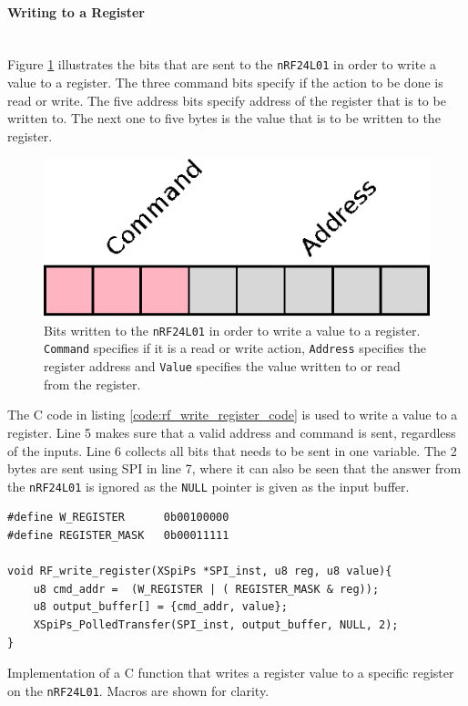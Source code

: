 \paragraph{Writing to a Register} %
\label{par:writing_to_a_register}
~\\
Figure \ref{fig:rw_register} illustrates the bits that are sent to the \texttt{nRF24L01} in order to write a value to a register. 
The three command bits specify if the action to be done is read or write.
The five address bits specify address of the register that is to be written to. 
The next one to five bytes is the value that is to be written to the register.

\begin{figure}[h]
	\centering
	\includegraphics[width=.3\linewidth]{graphics/rw_register.eps}
	\caption[Writing bits to a register on nRF24L01.]{Bits written to the \texttt{nRF24L01} in order to write a value to a register. \texttt{Command} specifies if it is a read or write action, \texttt{Address} specifies the register address and \texttt{Value} specifies the value written to or read from the register.}
	\label{fig:rw_register}
\end{figure}

The C code in listing \ref{code:rf_write_register_code} is used to write a value to a register. 
Line 5 makes sure that a valid address and command is sent, regardless of the inputs.
Line 6 collects all bits that needs to be sent in one variable. 
The 2 bytes are sent using SPI in line 7, where it can also be seen that the answer from the \texttt{nRF24L01} is ignored as the \texttt{NULL} pointer is given as the input buffer.  

\begin{listing}[h]
\begin{verbatim}
#define W_REGISTER      0b00100000
#define REGISTER_MASK   0b00011111

void RF_write_register(XSpiPs *SPI_inst, u8 reg, u8 value){
	u8 cmd_addr =  (W_REGISTER | ( REGISTER_MASK & reg));
	u8 output_buffer[] = {cmd_addr, value};
	XSpiPs_PolledTransfer(SPI_inst, output_buffer, NULL, 2);
}
\end{verbatim}
\caption{Implementation of a C function that writes a register value to a specific register on the \texttt{nRF24L01}. Macros are shown for clarity.}
\label{code:rf_write_register_code}
\end{listing}

